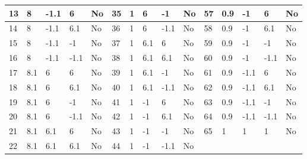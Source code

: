 \documentclass[12pt, letterpaper, titlepage]{article}
\begin{document}
\begin{tabular}{|l|l|l|l|l|l|l|l|l|l|l|l|l|l|l|}
    13   & 8   & -1.1 & 6    & No       & 35   & 1   & 6    & -1   & No    & 57   & 0.9 & -1   & 6    & No    \\ \hline
    14   & 8   & -1.1 & 6.1  & No       & 36   & 1   & 6    & -1.1 & No    & 58   & 0.9 & -1   & 6.1  & No    \\ \hline
    15   & 8   & -1.1 & -1   & No       & 37   & 1   & 6.1  & 6    & No    & 59   & 0.9 & -1   & -1   & No    \\ \hline
    16   & 8   & -1.1 & -1.1 & No       & 38   & 1   & 6.1  & 6.1  & No    & 60   & 0.9 & -1   & -1.1 & No    \\ \hline
    17   & 8.1 & 6    & 6    & No       & 39   & 1   & 6.1  & -1   & No    & 61   & 0.9 & -1.1 & 6    & No    \\ \hline
    18   & 8.1 & 6    & 6.1  & No       & 40   & 1   & 6.1  & -1.1 & No    & 62   & 0.9 & -1.1 & 6.1  & No    \\ \hline
    19   & 8.1 & 6    & -1   & No       & 41   & 1   & -1   & 6    & No    & 63   & 0.9 & -1.1 & -1   & No    \\ \hline
    20   & 8.1 & 6    & -1.1 & No       & 42   & 1   & -1   & 6.1  & No    & 64   & 0.9 & -1.1 & -1.1 & No    \\ \hline
    21   & 8.1 & 6.1  & 6    & No       & 43   & 1   & -1   & -1   & No    & 65   & 1   & 1    & 1    & No    \\ \hline
    22   & 8.1 & 6.1  & 6.1  & No       & 44   & 1   & -1   & -1.1 & No    &      &     &      &      &       \\ \hline
    \end{tabular}
\end{document}
